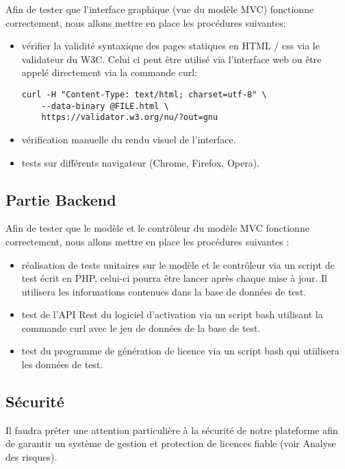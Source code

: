 Afin de tester que l'interface graphique (vue du modèle MVC) fonctionne correctement, nous allons mettre en place les procédures suivantes:
\begin{itemize}

    \item vérifier la validité syntaxique des pages statiques en HTML / css via 
          le validateur du W3C. Celui ci peut être utilisé via l'interface web ou  
          être appelé directement via la commande curl:
          \begin{verbatim}
curl -H "Content-Type: text/html; charset=utf-8" \
    --data-binary @FILE.html \
    https://validator.w3.org/nu/?out=gnu
          \end{verbatim}
              
    \item vérification manuelle du rendu visuel de l'interface.
    \item tests sur différents navigateur (Chrome, Firefox, Opera).
            
\end{itemize}
\newpage

\subsection{Partie Backend}

Afin de tester que le modèle et le contrôleur du modèle MVC fonctionne correctement, 
nous allons mettre en place les procédures suivantes :
\begin{itemize}
    \item réalisation de tests unitaires sur le modèle et le contrôleur via 
          un script de test écrit en PHP, celui-ci pourra être lancer après 
          chaque mise à jour. Il utilisera les informations contenues dans la  
          base de données de test.
        
    \item test de l'API Rest du logiciel d'activation via un script bash 
          utilisant la commande curl avec le jeu de données de la base de test.
        
    \item test du programme de génération de licence via un script bash qui
          utiilisera les données de test.
\end{itemize}

\subsection{Sécurité}
Il faudra prêter une attention particulière à la sécurité de notre plateforme afin de garantir un système
de gestion et protection de licences fiable (voir Analyse des risques).

